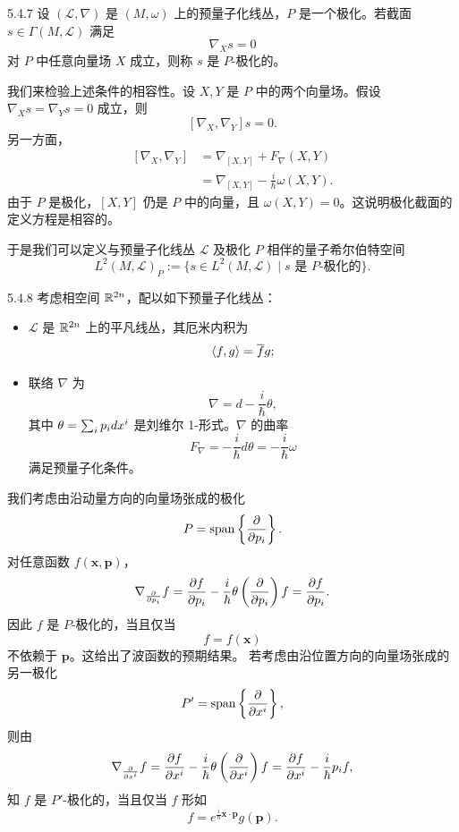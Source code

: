 \begin{definition}{5.4.7}
  设 $(\mathcal{L},\nabla)$ 是 $(M,\omega)$ 上的预量子化线丛，$P$ 是一个极化。若截面
  $s\in\Gamma(M,\mathcal{L})$ 满足
  \[
  \nabla_Xs=0
  \]
  对 $P$ 中任意向量场 $X$ 成立，则称 $s$ 是 $P$-极化的。
\end{definition}

我们来检验上述条件的相容性。设 $X,Y$ 是 $P$ 中的两个向量场。假设 $\nabla_Xs=\nabla_Ys=0$ 成立，则
\[
[\nabla_X,\nabla_Y]s=0.
\]
另一方面，
\[
\begin{aligned}
[\nabla_X,\nabla_Y]
&=\nabla_{[X,Y]}+F_\nabla(X,Y)\\
&=\nabla_{[X,Y]}-\frac{i}{\hbar}\omega(X,Y).
\end{aligned}
\]
由于 $P$ 是极化，$[X,Y]$ 仍是 $P$ 中的向量，且 $\omega(X,Y)=0$。这说明极化截面的定义方程是相容的。

于是我们可以定义与预量子化线丛 $\mathcal{L}$ 及极化 $P$ 相伴的量子希尔伯特空间
\[
L^2(M,\mathcal{L})_P
:=\{s\in L^2(M,\mathcal{L})\mid s\text{ 是 }P\text{-极化的}\}.
\]

\begin{example}{5.4.8}
  考虑相空间 $\mathbb{R}^{2n}$，配以如下预量子化线丛：
  \begin{itemize}
    \item $\mathcal{L}$ 是 $\mathbb{R}^{2n}$ 上的平凡线丛，其厄米内积为
    \[
    \langle f,g\rangle=\overline{f} g;
    \]
    \item 联络 $\nabla$ 为
    \[
    \nabla=d-\frac{i}{\hbar}\theta,
    \]
    其中 $\theta=\sum_i p_id x^i$ 是刘维尔 1-形式。$\nabla$ 的曲率
    \[
    F_\nabla=-\frac{i}{\hbar}d\theta=-\frac{i}{\hbar}\omega
    \]
    满足预量子化条件。
  \end{itemize}
  我们考虑由沿动量方向的向量场张成的极化
  \[
  P=\operatorname{span}\left\{\frac{\partial}{\partial p_i}\right\}.
  \]
  对任意函数 $f(\mathbf x,\mathbf p)$，
  \[
  \nabla_{\frac{\partial}{\partial p_i}}f=\frac{\partial f}{\partial p_i}
  -\frac{i}{\hbar}\theta\left(\frac{\partial}{\partial p_i}\right)f
  =\frac{\partial f}{\partial p_i}.
  \]
  因此 $f$ 是 $P$-极化的，当且仅当
  \[
  f=f(\mathbf x)
  \]
  不依赖于 $\mathbf p$。这给出了波函数的预期结果。
  若考虑由沿位置方向的向量场张成的另一极化
  \[
  P'=\operatorname{span}\left\{\frac{\partial}{\partial x^i}\right\},
  \]
  则由
  \[
  \nabla_{\frac{\partial}{\partial x^i}}f=\frac{\partial f}{\partial x^i}
  -\frac{i}{\hbar}\theta\left(\frac{\partial}{\partial x^i}\right)f
  =\frac{\partial f}{\partial x^i}-\frac{i}{\hbar}p_if,
  \]
  知 $f$ 是 $P'$-极化的，当且仅当 $f$ 形如
  \[
  f=e^{\frac{i}{\hbar}\mathbf x\cdot\mathbf p}g(\mathbf p).
  \]
\end{example}

